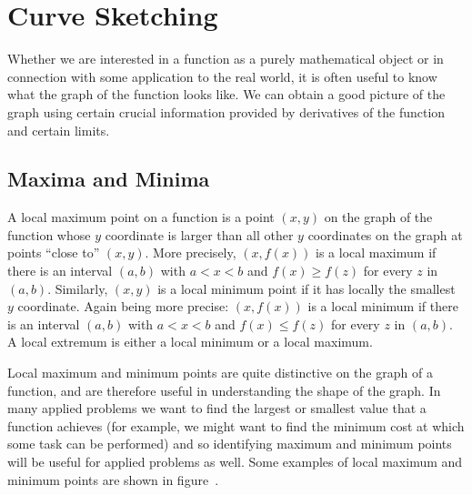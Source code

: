 \chapter{Curve Sketching}



Whether we are interested in a function as a purely mathematical
object or in connection with some application to the real world, it is
often useful to know what the graph of the function looks like. We can
obtain a good picture of the graph using certain crucial information
provided by derivatives of the function and certain limits.

\section{Maxima and Minima}{}{}
\nobreak
A {\dfont local maximum point\/} on a function is a
point $(x,y)$ on the graph of the function whose $y$ coordinate is
larger than all other $y$ coordinates on the graph at points ``close
to'' $(x,y)$. More precisely, $(x,f(x))$ is a local maximum if there
is an interval $(a,b)$ with $a<x<b$ and $f(x)\ge f(z)$ for every $z$
in $(a,b)$. Similarly, $(x,y)$ is a {\dfont local minimum point\/} if it has locally the smallest $y$ coordinate. Again
being more precise: $(x,f(x))$ is a local minimum if there
is an interval $(a,b)$ with $a<x<b$ and $f(x)\le f(z)$ for every $z$
in $(a,b)$. A 
{\dfont local extremum\/} is either a local minimum or a local maximum.

Local maximum and minimum points are quite distinctive on the graph of
a function, and are therefore useful in understanding the shape of the
graph. In many applied problems we want to find the largest or
smallest value that a function achieves (for example, we might want
to find the minimum cost at which some task can be performed) and so
identifying maximum and minimum points will be useful for applied
problems as well. Some examples of local maximum and minimum points
are shown in figure~.

